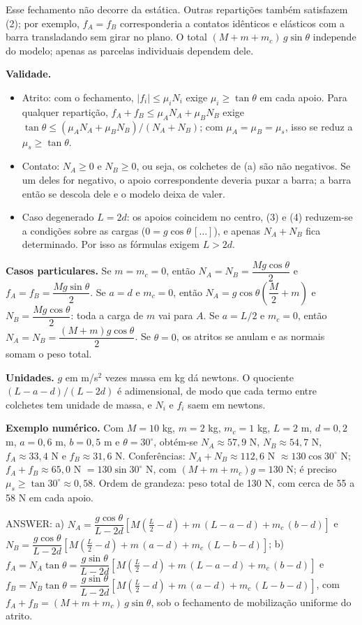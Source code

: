 \documentclass{article}%
\begin{document}
Esse fechamento não decorre da estática. Outras repartições também satisfazem (2); por exemplo, $f_A=f_B$ corresponderia a contatos idênticos e elásticos com a barra transladando sem girar no plano. O total $(M+m+m_c)\,g\sin\theta$ independe do modelo; apenas as parcelas individuais dependem dele.

\textbf{Validade.}
\begin{itemize}
\item Atrito: com o fechamento, $|f_i|\le\mu_i N_i$ exige $\mu_i\ge\tan\theta$ em cada apoio. Para qualquer repartição, $f_A+f_B\le\mu_A N_A+\mu_B N_B$ exige $\tan\theta\le(\mu_A N_A+\mu_B N_B)/(N_A+N_B)$; com $\mu_A=\mu_B=\mu_s$, isso se reduz a $\mu_s\ge\tan\theta$.
\item Contato: $N_A\ge 0$ e $N_B\ge 0$, ou seja, os colchetes de (a) são não negativos. Se um deles for negativo, o apoio correspondente deveria puxar a barra; a barra então se descola dele e o modelo deixa de valer.
\item Caso degenerado $L=2d$: os apoios coincidem no centro, (3) e (4) reduzem-se a condições sobre as cargas ($0=g\cos\theta\,[\dots]$), e apenas $N_A+N_B$ fica determinado. Por isso as fórmulas exigem $L>2d$.
\end{itemize}

\textbf{Casos particulares.} Se $m=m_c=0$, então $N_A=N_B=\dfrac{Mg\cos\theta}{2}$ e $f_A=f_B=\dfrac{Mg\sin\theta}{2}$. Se $a=d$ e $m_c=0$, então $N_A=g\cos\theta\left(\dfrac{M}{2}+m\right)$ e $N_B=\dfrac{Mg\cos\theta}{2}$: toda a carga de $m$ vai para $A$. Se $a=L/2$ e $m_c=0$, então $N_A=N_B=\dfrac{(M+m)g\cos\theta}{2}$. Se $\theta=0$, os atritos se anulam e as normais somam o peso total.

\textbf{Unidades.} $g$ em m/s$^2$ vezes massa em kg dá newtons. O quociente $(L-a-d)/(L-2d)$ é adimensional, de modo que cada termo entre colchetes tem unidade de massa, e $N_i$ e $f_i$ saem em newtons.

\textbf{Exemplo numérico.} Com $M=10$ kg, $m=2$ kg, $m_c=1$ kg, $L=2$ m, $d=0{,}2$ m, $a=0{,}6$ m, $b=0{,}5$ m e $\theta=30^\circ$, obtém-se $N_A\approx 57{,}9$ N, $N_B\approx 54{,}7$ N, $f_A\approx 33{,}4$ N e $f_B\approx 31{,}6$ N. Conferências: $N_A+N_B\approx 112{,}6$ N $\approx 130\cos 30^\circ$ N; $f_A+f_B\approx 65{,}0$ N $=130\sin 30^\circ$ N, com $(M+m+m_c)g=130$ N; é preciso $\mu_s\ge\tan 30^\circ\approx 0{,}58$. Ordem de grandeza: peso total de 130 N, com cerca de 55 a 58 N em cada apoio.

ANSWER: a) $N_A=\dfrac{g\cos\theta}{L-2d}\left[M\left(\frac{L}{2}-d\right)+m\,(L-a-d)+m_c\,(b-d)\right]$ e $N_B=\dfrac{g\cos\theta}{L-2d}\left[M\left(\frac{L}{2}-d\right)+m\,(a-d)+m_c\,(L-b-d)\right]$; b) $f_A=N_A\tan\theta=\dfrac{g\sin\theta}{L-2d}\left[M\left(\frac{L}{2}-d\right)+m\,(L-a-d)+m_c\,(b-d)\right]$ e $f_B=N_B\tan\theta=\dfrac{g\sin\theta}{L-2d}\left[M\left(\frac{L}{2}-d\right)+m\,(a-d)+m_c\,(L-b-d)\right]$, com $f_A+f_B=(M+m+m_c)\,g\sin\theta$, sob o fechamento de mobilização uniforme do atrito.%
\newpage%
\end{document}
